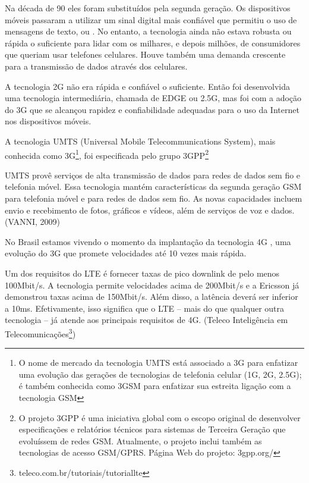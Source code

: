 Na década de 90 eles foram substituídos pela segunda geração. Os dispositivos móveis passaram a utilizar um sinal digital mais confiável que permitiu o uso de mensagens de texto, ou . No entanto, a tecnologia ainda não estava robusta ou rápida o suficiente para lidar com os milhares, e depois milhões, de consumidores que queriam usar telefones celulares. Houve também uma demanda crescente para a transmissão de dados através dos celulares.

A tecnologia 2G não era rápida e confiável o suficiente. Então foi desenvolvida uma tecnologia intermediária, chamada de EDGE ou 2.5G, mas foi com a adoção do 3G que se alcançou rapidez e confiabilidade adequadas para o uso da Internet nos dispositivos móveis.
\begin{citacao}
A tecnologia UMTS (Universal Mobile Telecommunications System), mais conhecida como 3G\footnote{O nome de mercado da tecnologia UMTS está associado a 3G para enfatizar uma evolução das gerações de tecnologias de telefonia celular (1G, 2G, 2.5G); é também conhecida como 3GSM para enfatizar sua estreita ligação com a tecnologia GSM}, foi especificada pelo grupo 3GPP\footnote{O projeto 3GPP é uma iniciativa global com o escopo original de desenvolver especificações e relatórios técnicos para sistemas de Terceira Geração que evoluíssem de redes GSM. Atualmente, o projeto inclui também as tecnologias de acesso GSM/GPRS. Página Web do projeto: 3gpp.org/}

UMTS provê serviços de alta transmissão de dados para redes de dados sem fio e telefonia móvel. Essa tecnologia mantém características da segunda geração GSM para telefonia móvel e  para redes de dados sem fio. As novas capacidades incluem envio e recebimento de fotos, gráficos e vídeos, além de serviços de voz e dados. (VANNI, 2009)
\end{citacao}

No Brasil estamos vivendo o momento da implantação da tecnologia 4G , uma evolução do 3G que promete velocidades até 10 vezes mais rápida.

\begin{citacao}
Um dos requisitos do LTE é fornecer taxas de pico downlink de pelo menos 100Mbit/s. A tecnologia permite velocidades acima de 200Mbit/s e a Ericsson já demonstrou taxas acima de 150Mbit/s. Além disso, a latência  deverá ser inferior a 10ms. Efetivamente, isso significa que o LTE – mais do que qualquer outra tecnologia – já atende aos principais requisitos de 4G. (Teleco Inteligência em Telecomunicações\footnote{teleco.com.br/tutoriais/tutoriallte})
\end{citacao}

